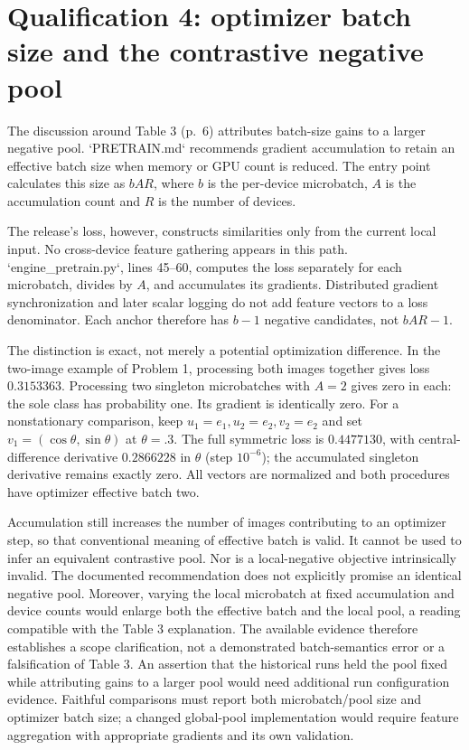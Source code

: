 \documentclass[10pt]{article}
\begin{document}
\section*{Qualification 4: optimizer batch size and the contrastive negative pool}
The discussion around Table 3 (p. 6) attributes batch-size gains to a larger negative pool. `PRETRAIN.md` recommends gradient accumulation to retain an effective batch size when memory or GPU count is reduced. The entry point calculates this size as \(bAR\), where \(b\) is the per-device microbatch, \(A\) is the accumulation count and \(R\) is the number of devices.\par
The release’s loss, however, constructs similarities only from the current local input. No cross-device feature gathering appears in this path. `engine\_pretrain.py`, lines 45–60, computes the loss separately for each microbatch, divides by \(A\), and accumulates its gradients. Distributed gradient synchronization and later scalar logging do not add feature vectors to a loss denominator. Each anchor therefore has \(b-1\) negative candidates, not \(bAR-1\).\par
The distinction is exact, not merely a potential optimization difference. In the two-image example of Problem 1, processing both images together gives loss \(0.3153363\). Processing two singleton microbatches with \(A=2\) gives zero in each: the sole class has probability one. Its gradient is identically zero. For a nonstationary comparison, keep \(u_1=e_1,u_2=e_2,v_2=e_2\) and set \(v_1=(\cos\theta,\sin\theta)\) at \(\theta=.3\). The full symmetric loss is \(0.4477130\), with central-difference derivative \(0.2866228\) in \(\theta\) (step \(10^{-6}\)); the accumulated singleton derivative remains exactly zero. All vectors are normalized and both procedures have optimizer effective batch two.\par
Accumulation still increases the number of images contributing to an optimizer step, so that conventional meaning of effective batch is valid. It cannot be used to infer an equivalent contrastive pool. Nor is a local-negative objective intrinsically invalid. The documented recommendation does not explicitly promise an identical negative pool. Moreover, varying the local microbatch at fixed accumulation and device counts would enlarge both the effective batch and the local pool, a reading compatible with the Table 3 explanation. The available evidence therefore establishes a scope clarification, not a demonstrated batch-semantics error or a falsification of Table 3. An assertion that the historical runs held the pool fixed while attributing gains to a larger pool would need additional run configuration evidence. Faithful comparisons must report both microbatch/pool size and optimizer batch size; a changed global-pool implementation would require feature aggregation with appropriate gradients and its own validation.\par
\end{document}
